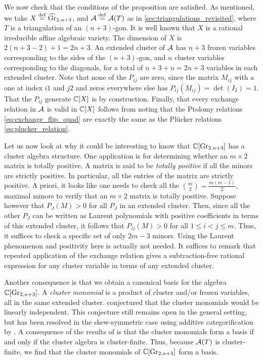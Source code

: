 We now check that the conditions of the proposition are satisfied. As mentioned, we
take $X \overset{\mathrm{def}}{=} \widehat{\operatorname{Gr}}_{2, n+3}$, and $\mathcal{A} \overset{\mathrm{def}}{=} \mathcal{A}(T)$ as in
\cref{sec:triangulations_revisited}, where $T$ is a triangulation of an $(n+3)$-gon. It
is well known \cite[Proposition 12.7]{FominZelevinsky2003CAFin} that $X$ is a rational
irreducible affine algebraic variety. The dimension of $X$ is $2 (n+3 - 2) + 1 = 2n
	+3$. An extended cluster of $\mathcal{A}$ has $n+3$ frozen variables corresponding to the
sides of the $(n+3)$-gon, and $n$ cluster variables corresponding to the diagonals, for
a total of $n+3 + n = 2n +3$ variables in each extended cluster. Note that none of the
$P_{ij}$ are zero, since the matrix $M_{ij}$ with a one at index $i1$ and $j2$ and
zeros everywhere else has $P_{ij}(M_{ij}) = \det(I_2) = 1$. That the $P_{ij}$ generate
$\mathbb{C}[X]$ is by construction. Finally, that every exchange relation in $\mathcal{A}$ is valid
in $\mathbb{C}[X]$ follows from noting that the Ptolomy relations
\cref{eq:exchange_flip_quad} are exactly the same as the Plücker relations
\cref{eq:plucker_relation}.

\medskip

Let us now look at why it could be interesting to know that $\mathbb{C}[\operatorname{Gr}_{2, n+3}]$ has a
cluster algebra structure. One application is for determining whether an $m \times 2$
matrix is totally positive. A matrix is said to be \emph{totally
	positive} if all the minors are strictly positive. In
particular, all the entries of the matrix are strictly positive. A priori, it looks
like one needs to check all the $\binom{m}{2} = \frac{m(m-1)}{2}$, maximal minors to
verify that an $m \times 2$ matrix is totally positive. Suppose however that $P_J(M) >
	0$ for all $P_J$ in an extended cluster. Then, since all the other $P_J$ can be written
as Laurent polynomials with positive coefficients in terms of this extended cluster, it
follows that $P_{ij}(M) > 0$ for all $1 \leq i < j \leq m$. Thus, it suffices to check
a specific set of only $2m - 3$ minors. Using the Laurent phenomenon and positivity
here is actually not needed. It suffices to remark that repeated application of the
exchange relation gives a subtraction-free rational expression for any cluster variable
in terms of any extended cluster.

Another consequence is that we obtain a canonical basis for the algebra $\mathbb{C}[\operatorname{Gr}_{2,
			n+3}]$. A \emph{cluster monomial} is a product of cluster
and/or frozen variables, all in the same extended cluster.
\Textcite{FominZelevinsky2002CAF} conjectured that the cluster monomials would be
linearly independent. This conjecture still remains open in the general setting, but
has been resolved in the skew-symmetric case using additive categorification by
\textcite{CerulliKeller2013LinearIndependenceCMSSCA}. A consequence of the results of
\textcite{GrossHackingKeelKontsevich2018CanonicalBCA} is that the cluster monomials
form a basis if and only if the cluster algebra is cluster-finite. Thus, because
$\mathcal{A}(T)$ is cluster-finite, we find that the cluster monomials of $\mathbb{C}[\operatorname{Gr}_{2, n+3}]$
form a basis.

